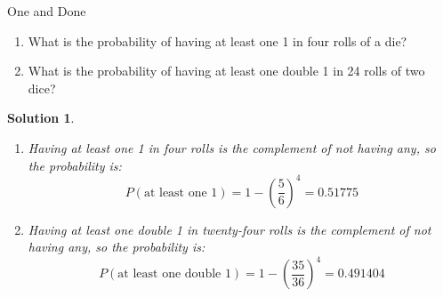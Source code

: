 \documentclass[11pt]{article}
\newtheorem*{solution}{Solution}
\theoremstyle{mystyle}
\newtheorem{pproblem}{Problem}
\begin{document}
\begin{psproblem}{One and Done}{}
\begin{enumerate}[label=\alph*.]
\item What is the probability of having at least one 1 in four rolls of a die?
\item What is the probability of having at least one double 1 in 24 rolls of two dice?
\end{enumerate}
\end{psproblem}

\begin{solution}
\leavevmode
\begin{enumerate}[label=\alph*.]
\item Having at least one 1 in four rolls is the complement of not having any, so the probability is: 
\[
P(\text{at least one 1}) = 1 - \left(\dfrac{5}{6}\right)^4=\boxed{0.51775}
\]
\item Having at least one double 1 in twenty-four rolls is the complement of not having any, so the probability is:
\[
P(\text{at least one double 1})=1-\left( \dfrac{35}{36} \right) ^4=\boxed{0.491404}
\]
\end{enumerate}

\end{solution}




%
%
\end{document}
